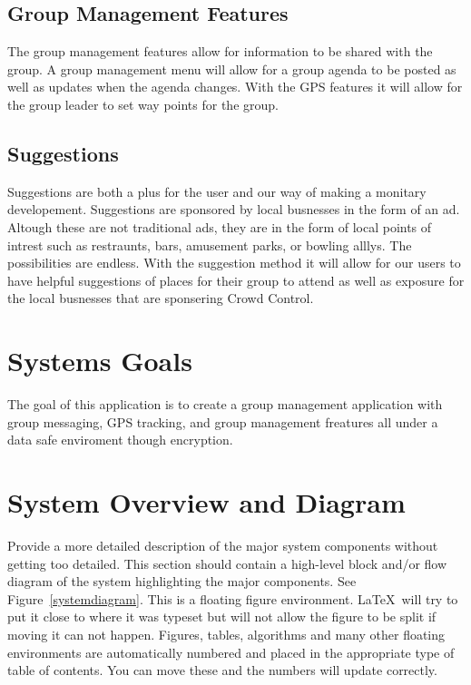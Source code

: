 \subsection{Group Management Features}
The group management features allow for information to be shared with the group. A group management menu will allow for a group agenda to be posted as well as updates when the agenda changes. With the GPS features it will allow for the group leader to set way points for the group.  

\subsection{Suggestions}
Suggestions are both a plus for the user and our way of making a monitary developement. Suggestions are sponsored by local busnesses in the form of an ad. Altough these are not traditional ads, they are in the form of local points of intrest such as restraunts, bars, amusement parks, or bowling alllys. The possibilities are endless. With the suggestion method it will allow for our users to have helpful suggestions of places for their group to attend as well as exposure for the local busnesses that are sponsering Crowd Control.

\section{Systems Goals}
The goal of this application is to create a group management application with group messaging, GPS tracking, and group management freatures all under a data safe enviroment though encryption.

\section{System Overview and Diagram}
Provide a more detailed description of the major system components
without getting too detailed.  This section should contain a
high-level block and/or flow diagram of the system highlighting the
major components.  See Figure~\ref{systemdiagram}.  This is a floating
figure environment.  \LaTeX\ will try to put it close to where it was
typeset but will not allow the figure to be split if moving it can not
happen.  Figures, tables, algorithms and many other floating
environments are automatically numbered and placed in the appropriate
type of table of contents.  You can move these and the numbers will
update correctly.

